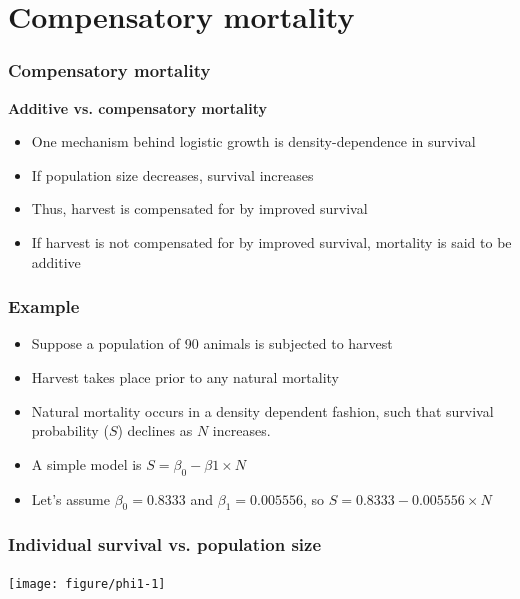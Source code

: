 \documentclass[color=usenames,dvipsnames]{beamer}\usepackage[]{graphicx}\usepackage[]{color}
\begin{document}
\section{Compensatory mortality}






\begin{frame}
  \frametitle{Compensatory mortality}
  \large
  {\bf Additive vs. compensatory mortality}
  \begin{itemize}[<+->]
    \item One mechanism behind logistic growth is density-dependence in
      survival
    \item If population size decreases, survival increases
    \item Thus, harvest is compensated for by improved survival
    \item If harvest is not compensated for by improved survival, mortality is
      said to be additive
  \end{itemize}
\end{frame}



\begin{frame}
  \frametitle{Example}
  \large
  \begin{itemize}[<+->]
    \item Suppose a population of 90 animals is subjected to harvest
    \item Harvest takes place prior to any natural mortality
    \item Natural mortality occurs in a density dependent fashion,
      such that survival probability ($S$) declines as $N$ increases.
    \item A simple model is $S = \beta_0 - \beta1 \times N$
    \item Let's assume $\beta_0 = 0.8333$ and $\beta_1 = 0.005556$, so
      $S = 0.8333 - 0.005556 \times N$
  \end{itemize}
\end{frame}



\begin{frame}[fragile]
  \frametitle{Individual survival vs. population size}
  \vspace{-0.5cm}

\par
  \begin{center}
    \texttt{[image: figure/phi1-1]}
  \end{center}
\end{frame}
\end{document}
